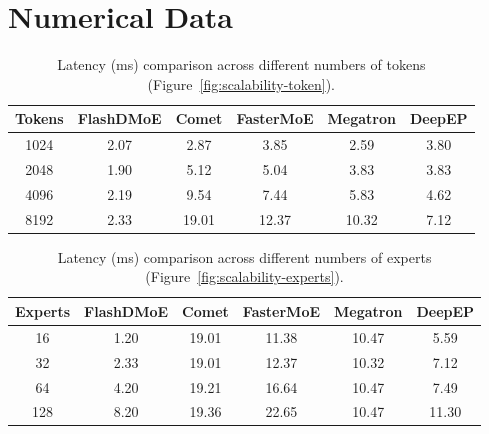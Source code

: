 \section{Numerical Data}\label{sec:numerical-data}
\begin{table}[!ht]
    \centering
    \caption{Latency (ms) comparison across different numbers of tokens (Figure~\ref{fig:scalability-token}).}
    \label{tab:latency-tokens}
    \setlength{\tabcolsep}{5pt}
    \renewcommand{\arraystretch}{0.9}
    \begin{tabular}{cccccc}
        \toprule
        \textbf{Tokens} & \textbf{FlashDMoE} & \textbf{Comet} & \textbf{FasterMoE} & \textbf{Megatron} & \textbf{DeepEP} \\
        \midrule
        1024  & 2.07 & 2.87 & 3.85 & 2.59 & 3.80 \\
        2048  & 1.90 & 5.12 & 5.04 & 3.83 & 3.83 \\
        4096  & 2.19 & 9.54 & 7.44 & 5.83 & 4.62 \\
        8192  & 2.33 & 19.01 & 12.37 & 10.32 & 7.12 \\
        \bottomrule
    \end{tabular}
    \vspace{-0.4cm}
\end{table}
\begin{table}[!ht]
    \centering
    \caption{Latency (ms) comparison across different numbers of experts (Figure~\ref{fig:scalability-experts}).}
    \label{tab:latency-experts}
    \setlength{\tabcolsep}{5pt}
    \renewcommand{\arraystretch}{0.9}
    \begin{tabular}{cccccc}
        \toprule
        \textbf{Experts} & \textbf{FlashDMoE} & \textbf{Comet} & \textbf{FasterMoE} & \textbf{Megatron} & \textbf{DeepEP} \\
        \midrule
        16  & 1.20 & 19.01 & 11.38 & 10.47 & 5.59 \\
        32  & 2.33 & 19.01 & 12.37 & 10.32 & 7.12 \\
        64  & 4.20 & 19.21 & 16.64 & 10.47 & 7.49 \\
        128 & 8.20 & 19.36 & 22.65 & 10.47 & 11.30 \\
        \bottomrule
    \end{tabular}
    \vspace{-0.4cm}
\end{table}

